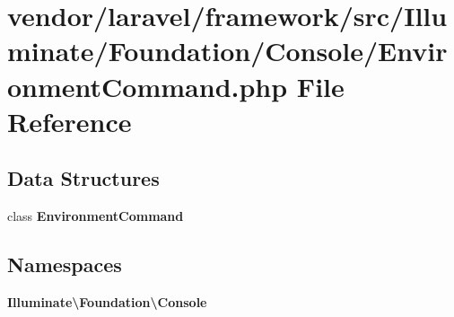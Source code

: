 \section{vendor/laravel/framework/src/\+Illuminate/\+Foundation/\+Console/\+Environment\+Command.php File Reference}
\label{_environment_command_8php}
\subsection*{Data Structures}
\begin{DoxyCompactItemize}
\item 
class {\bf Environment\+Command}
\end{DoxyCompactItemize}
\subsection*{Namespaces}
\begin{DoxyCompactItemize}
\item 
 {\bf Illuminate\textbackslash{}\+Foundation\textbackslash{}\+Console}
\end{DoxyCompactItemize}
